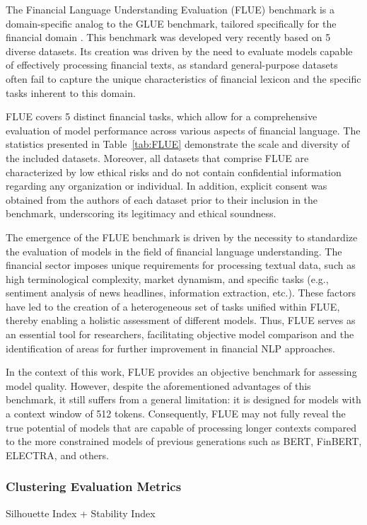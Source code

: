 The Financial Language Understanding Evaluation (FLUE) benchmark is a domain-specific analog to the GLUE benchmark,
tailored specifically for the financial domain \parencite{FLANG2022FLUE}. This benchmark was developed very recently based
on 5 diverse datasets. Its creation was driven by the need to evaluate models capable of effectively processing
financial texts, as standard general-purpose datasets often fail to capture the unique characteristics of financial
lexicon and the specific tasks inherent to this domain.



FLUE covers 5 distinct financial tasks, which allow for a comprehensive evaluation of model performance across various aspects
of financial language. The statistics presented in Table~\ref{tab:FLUE} demonstrate the scale and diversity of the included datasets.
Moreover, all datasets that comprise FLUE are characterized by low ethical risks and do not contain confidential information regarding
any organization or individual. In addition, explicit consent was obtained from the authors of each dataset prior to their inclusion
in the benchmark, underscoring its legitimacy and ethical soundness.

The emergence of the FLUE benchmark is driven by the necessity to standardize the evaluation of models in the field of financial
language understanding. The financial sector imposes unique requirements for processing textual data, such as high terminological
complexity, market dynamism, and specific tasks (e.g., sentiment analysis of news headlines, information extraction, etc.). These
factors have led to the creation of a heterogeneous set of tasks unified within FLUE, thereby enabling a holistic assessment
of different models. Thus, FLUE serves as an essential tool for researchers, facilitating objective model comparison
and the identification of areas for further improvement in financial NLP approaches.

In the context of this work, FLUE provides an objective benchmark for assessing model quality. However, despite the aforementioned
advantages of this benchmark, it still suffers from a general limitation: it is designed for models with a context window
of 512 tokens. Consequently, FLUE may not fully reveal the true potential of models that are capable of processing longer contexts
compared to the more constrained models of previous generations such as BERT, FinBERT, ELECTRA, and others.

\subsubsection{Clustering Evaluation Metrics}
Silhouette Index + Stability Index